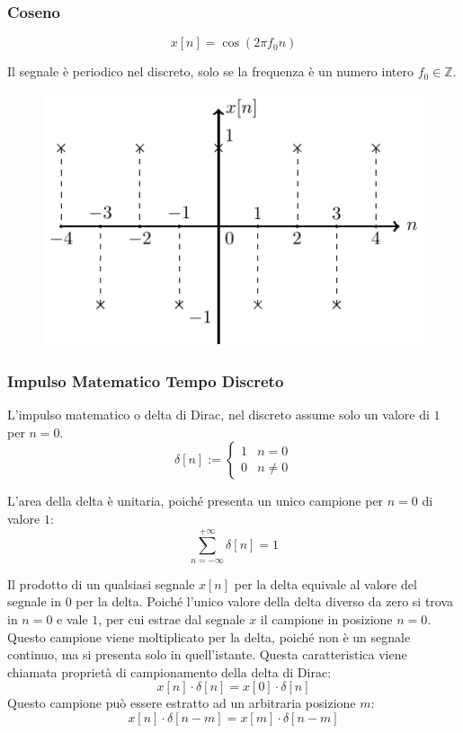 \documentclass{article}
\numberwithin{equation}{subsection}
\begin{document}
\subsubsection{Coseno}

\begin{equation}
    x[n]=\cos(2\pi f_0n)
\end{equation}

Il segnale è periodico nel discreto, solo se la frequenza è un numero intero $f_0\in\mathbb{Z}$. 

\begin{figure}[H]%
    \centering
    \includegraphics{coseno-discreto.pdf}%
\end{figure}

\subsubsection{Impulso Matematico Tempo Discreto}

L'impulso matematico o delta di Dirac, nel discreto assume solo un valore di $1$ per $n=0$. 
\begin{equation}
    \delta[n]:=\begin{cases}
        1&n=0\\
        0&n\neq0
    \end{cases}
\end{equation}

L'area della delta è unitaria, poiché presenta un unico campione per $n=0$ di valore $1$:
\begin{equation}
    \displaystyle\sum_{n=-\infty}^{+\infty}\delta[n]=1
\end{equation}



Il prodotto di un qualsiasi segnale $x[n]$ per la delta equivale al valore del segnale in $0$ per la delta. Poiché l'unico valore della delta diverso da zero si trova in $n=0$ 
e vale $1$, per cui estrae dal segnale $x$ il campione in posizione $n=0$. Questo campione viene moltiplicato per la delta, poiché non è un segnale continuo, ma si presenta 
solo in quell'istante. Questa caratteristica viene chiamata proprietà di campionamento 
della delta di Dirac:
\begin{equation*}
    x[n]\cdot\delta[n]=x[0]\cdot\delta[n]
\end{equation*}
Questo campione può essere estratto ad un arbitraria posizione $m$:
\begin{equation}
    x[n]\cdot\delta[n-m]=x[m]\cdot\delta[n-m]
\end{equation}
\end{document}
